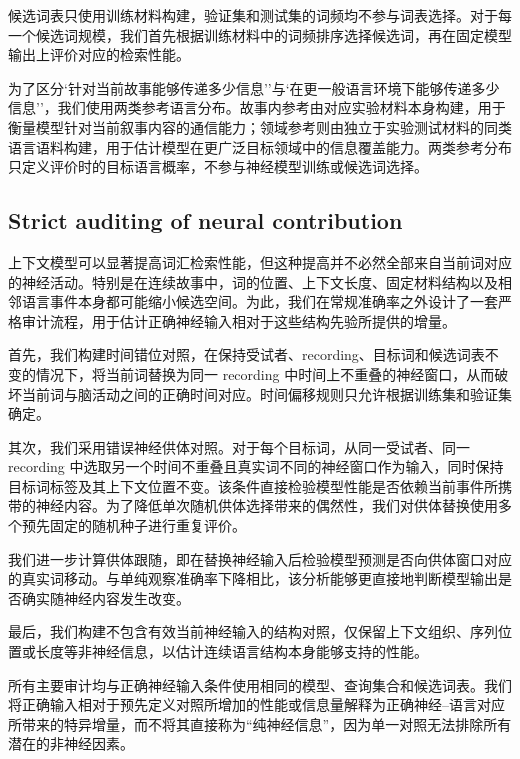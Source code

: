 候选词表只使用训练材料构建，验证集和测试集的词频均不参与词表选择。对于每一个候选词规模，我们首先根据训练材料中的词频排序选择候选词，再在固定模型输出上评价对应的检索性能。

为了区分`针对当前故事能够传递多少信息''与`在更一般语言环境下能够传递多少信息''，我们使用两类参考语言分布。故事内参考由对应实验材料本身构建，用于衡量模型针对当前叙事内容的通信能力；领域参考则由独立于实验测试材料的同类语言语料构建，用于估计模型在更广泛目标领域中的信息覆盖能力。两类参考分布只定义评价时的目标语言概率，不参与神经模型训练或候选词选择。

\subsection{Strict auditing of neural contribution}

上下文模型可以显著提高词汇检索性能，但这种提高并不必然全部来自当前词对应的神经活动。特别是在连续故事中，词的位置、上下文长度、固定材料结构以及相邻语言事件本身都可能缩小候选空间。为此，我们在常规准确率之外设计了一套严格审计流程，用于估计正确神经输入相对于这些结构先验所提供的增量。

首先，我们构建时间错位对照，在保持受试者、recording、目标词和候选词表不变的情况下，将当前词替换为同一 recording 中时间上不重叠的神经窗口，从而破坏当前词与脑活动之间的正确时间对应。时间偏移规则只允许根据训练集和验证集确定。

其次，我们采用错误神经供体对照。对于每个目标词，从同一受试者、同一 recording 中选取另一个时间不重叠且真实词不同的神经窗口作为输入，同时保持目标词标签及其上下文位置不变。该条件直接检验模型性能是否依赖当前事件所携带的神经内容。为了降低单次随机供体选择带来的偶然性，我们对供体替换使用多个预先固定的随机种子进行重复评价。

我们进一步计算供体跟随，即在替换神经输入后检验模型预测是否向供体窗口对应的真实词移动。与单纯观察准确率下降相比，该分析能够更直接地判断模型输出是否确实随神经内容发生改变。

最后，我们构建不包含有效当前神经输入的结构对照，仅保留上下文组织、序列位置或长度等非神经信息，以估计连续语言结构本身能够支持的性能。

所有主要审计均与正确神经输入条件使用相同的模型、查询集合和候选词表。我们将正确输入相对于预先定义对照所增加的性能或信息量解释为正确神经--语言对应所带来的特异增量，而不将其直接称为``纯神经信息''，因为单一对照无法排除所有潜在的非神经因素。
